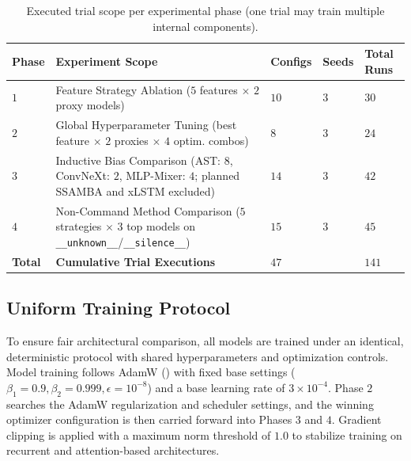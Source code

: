 \documentclass[cameraready]{Interspeech}
\begin{document}
\begin{table}[H]
\centering
\caption{Executed trial scope per experimental phase (one trial may train multiple internal components).}
\label{tab:model_calls}
\small
\begin{tabular}{@{} p{0.7cm} p{3.5cm} >{\centering\arraybackslash}p{0.8cm} >{\centering\arraybackslash}p{0.5cm} >{\centering\arraybackslash}p{0.8cm} @{}}
\toprule
\textbf{Phase} & \textbf{Experiment Scope} & \textbf{Configs} & \textbf{Seeds} & \textbf{Total Runs} \\ \midrule
\textbf{$1$} & Feature Strategy Ablation \newline ($5$ features $\times$ $2$ proxy models) & $10$ & $3$ & $30$ \\
\textbf{$2$} & Global Hyperparameter Tuning \newline (best feature $\times$ $2$ proxies $\times$ $4$ optim. combos) & $8$ & $3$ & $24$ \\
\textbf{$3$} & Inductive Bias Comparison \newline (AST: $8$, ConvNeXt: $2$, MLP-Mixer: $4$; planned SSAMBA and xLSTM excluded) & $14$ & $3$ & $42$ \\
\textbf{$4$} & Non-Command Method Comparison \newline ($5$ strategies $\times$ $3$ top models on \texttt{\_\_unknown\_\_}/\texttt{\_\_silence\_\_}) & $15$ & $3$ & $45$ \\ \midrule
\textbf{Total} & \textbf{Cumulative Trial Executions} & \textbf{$47$} & & \textbf{$141$} \\ \bottomrule
\end{tabular}
\end{table}

\subsection{Uniform Training Protocol}
To ensure fair architectural comparison, all models are trained under an identical, deterministic protocol with shared hyperparameters and optimization controls. Model training follows AdamW (\cite{loshchilov2019adamw}) with fixed base settings ($\beta_1 = 0.9, \beta_2 = 0.999, \epsilon = 10^{-8}$) and a base learning rate of $3 \times 10^{-4}$. Phase $2$ searches the AdamW regularization and scheduler settings, and the winning optimizer configuration is then carried forward into Phases $3$ and $4$. Gradient clipping is applied with a maximum norm threshold of $1.0$ to stabilize training on recurrent and attention-based architectures.
\end{document}

